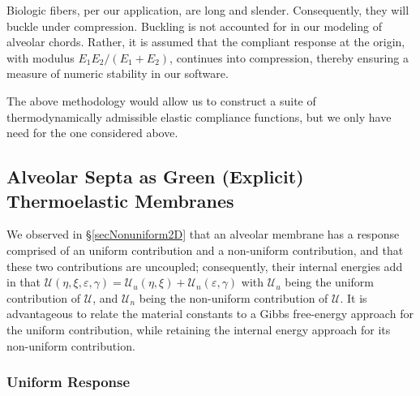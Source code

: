 Biologic fibers, per our application, are long and slender.  Consequently, they will buckle under compression.  Buckling is not accounted for in our modeling of alveolar chords.  Rather, it is assumed that the compliant response at the origin, with modulus $E_1 E_2 / ( E_1 + E_2 )$, continues into compression, thereby ensuring a measure of numeric stability in our software.

The above methodology would allow us to construct a suite of thermo\-dynamically admissible elastic compliance functions, but we only have need for the one considered above.

\subsection{Alveolar Septa as Green (Explicit) Thermoelastic Membranes}

We observed in \S\ref{secNonuniform2D} that an alveolar membrane has a response comprised of an uniform contribution and a non-uniform contribution, and that these two contributions are uncoupled; consequently, their internal energies add in that $\mathcal{U} (\eta , \xi , \varepsilon , \gamma) = \mathcal{U}_u (\eta , \xi) + \mathcal{U}_n (\varepsilon , \gamma)$ with $\mathcal{U}_u$ being the uniform contribution of $\mathcal{U}$, and $\mathcal{U}_n$ being the non-uniform contribution of $\mathcal{U}$.  It is advantageous to relate the material constants to a Gibbs free-energy approach for the uniform contribution, while retaining the internal energy approach for its non-uniform contribution.

\subsubsection{Uniform Response}

